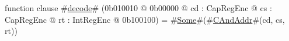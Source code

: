 function clause #\hyperref[sailMIPSzdecode]{decode}# (0b010010 @ 0b00000 @ cd : CapRegEnc @ cs : CapRegEnc @ rt : IntRegEnc @ 0b100100) = #\hyperref[sailMIPSzSome]{Some}#(#\hyperref[sailMIPSzCAndAddr]{CAndAddr}#(cd, cs, rt))

